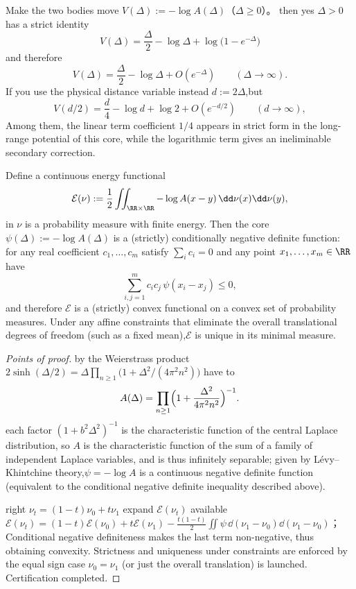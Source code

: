 \begin{remark}\label{rem:xi-hellinger-two-body-potential-area-log}
Make the two bodies move \(V(\Delta):=-\log A(\Delta)\)（\(\Delta\ge 0\)）。
then yes \(\Delta>0\) has a strict identity
\[
\boxed{\;
V(\Delta)=\frac{\Delta}{2}-\log\Delta+\log\bigl(1-e^{-\Delta}\bigr)\;}
\]
and therefore
\[
V(\Delta)=\frac{\Delta}{2}-\log\Delta+O(e^{-\Delta})\qquad(\Delta\to\infty).
\]
If you use the physical distance variable instead \(d:=2\Delta\),but
\[
V(d/2)=\frac{d}{4}-\log d+\log 2+O(e^{-d/2})\qquad(d\to\infty),
\]
Among them, the linear term coefficient \(1/4\) appears in strict form in the long-range potential of this core, while the logarithmic term gives an ineliminable secondary correction.
\end{remark}

\begin{proposition}\label{prop:xi-hellinger-energy-functional-strict-convexity}
Define a continuous energy functional
\[
\mathcal E(\nu):=\frac12\iint_{\RR\times\RR} -\log A(x-y)\,\dd\nu(x)\dd\nu(y),
\]
in \(\nu\) is a probability measure with finite energy.
Then the core \(\psi(\Delta):=-\log A(\Delta)\) is a (strictly) conditionally negative definite function: for any real coefficient \(c_1,\dots,c_m\) satisfy \(\sum_i c_i=0\) and any point \(x_1,\dots,x_m\in\RR\) have
\[
\sum_{i,j=1}^{m}c_ic_j\,\psi(x_i-x_j)\le 0,
\]
and therefore \(\mathcal E\) is a (strictly) convex functional on a convex set of probability measures.
Under any affine constraints that eliminate the overall translational degrees of freedom (such as a fixed mean),\(\mathcal E\) is unique in its minimal measure.
\end{proposition}
\begin{proof}[Points of proof]
by the Weierstrass product
\(
2\sinh(\Delta/2)=\Delta\prod_{n\ge 1}\bigl(1+\Delta^2/(4\pi^2n^2)\bigr)
\)
have to
\[
A(\Delta)=\prod_{n\ge 1}\Bigl(1+\frac{\Delta^2}{4\pi^2n^2}\Bigr)^{-1}.
\]
each factor \((1+b^2\Delta^2)^{-1}\) is the characteristic function of the central Laplace distribution, so \(A\) is the characteristic function of the sum of a family of independent Laplace variables, and is thus infinitely separable; given by L\'evy--Khintchine theory,\(\psi=-\log A\) is a continuous negative definite function (equivalent to the conditional negative definite inequality described above).
\par
right \(\nu_t=(1-t)\nu_0+t\nu_1\) expand \(\mathcal E(\nu_t)\) available
\(
\mathcal E(\nu_t)=(1-t)\mathcal E(\nu_0)+t\mathcal E(\nu_1)-\frac{t(1-t)}{2}\iint \psi\,\dd(\nu_1-\nu_0)\dd(\nu_1-\nu_0)
\)；
Conditional negative definiteness makes the last term non-negative, thus obtaining convexity. Strictness and uniqueness under constraints are enforced by the equal sign case \(\nu_0=\nu_1\) (or just the overall translation) is launched. Certification completed.
\end{proof}

